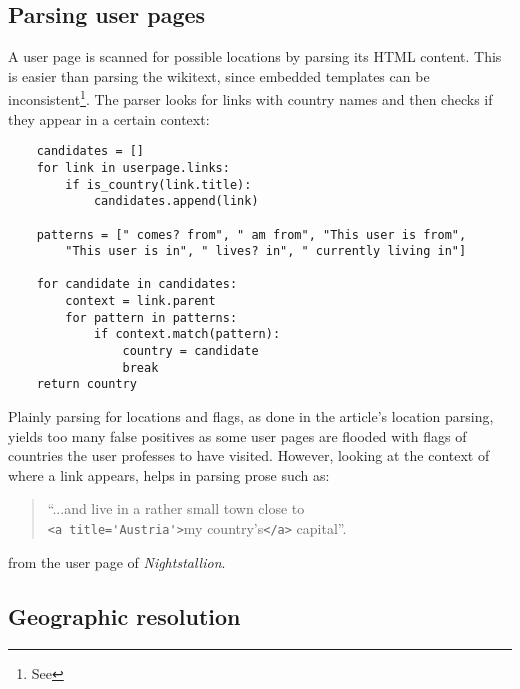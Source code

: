 \subsection{Parsing user pages}\label{sub:parsinguserpages}

A user page is scanned for possible locations by parsing its \ac{HTML} content.
This is easier than parsing the wikitext, since embedded templates can be inconsistent\footnote{See }.
The parser looks for links with country names and then checks if they appear in a certain context:

\begin{lstlisting}
	candidates = []
	for link in userpage.links:
		if is_country(link.title):
			candidates.append(link)

	patterns = [" comes? from", " am from", "This user is from", 
		"This user is in", " lives? in", " currently living in"]
		
	for candidate in candidates:
		context = link.parent
		for pattern in patterns:
			if context.match(pattern):
				country = candidate
				break
	return country
\end{lstlisting}

Plainly parsing for locations and flags, as done in the article's location parsing, yields too many false positives as some user pages are flooded with flags of countries the user professes to have visited.
However, looking at the context of where a link appears, helps in parsing prose such as:
\begin{quotation}
 ``...and live in a rather small town close to \\\verb"<a title='Austria'>"my country's\verb"</a>" capital''.
\end{quotation}
from the user page of \emph{Nightstallion}.


\subsection{Geographic resolution}\label{sub:resolution}

